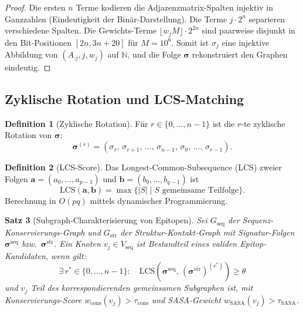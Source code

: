 ﻿\documentclass[a4paper,12pt]{article}
\theoremstyle{plain}
\newtheorem{satz}{Satz}[section]
\theoremstyle{definition}
\newtheorem{definition}[satz]{Definition}
\theoremstyle{remark}
\begin{document}
\begin{proof}
Die ersten $n$ Terme kodieren die Adjazenzmatrix-Spalten injektiv in Ganzzahlen
(Eindeutigkeit der Binär-Darstellung). Die Terme $j\cdot 2^n$ separieren verschiedene
Spalten. Die Gewichts-Terme $\lfloor w_j M\rfloor\cdot 2^{2n}$ sind paarweise disjunkt
in den Bit-Positionen $[2n, 3n+20]$ für $M=10^6$. Somit ist $\sigma_j$ eine injektive
Abbildung von $(A_{\cdot j}, j, w_j)$ auf $\mathbb{N}$, und die Folge
$\boldsymbol{\sigma}$ rekonstruiert den Graphen eindeutig.
\end{proof}

\subsection{Zyklische Rotation und LCS-Matching}

\begin{definition}[Zyklische Rotation]
Für $r\in\{0,\ldots,n-1\}$ ist die $r$-te zyklische Rotation von $\boldsymbol{\sigma}$:
\[
  \boldsymbol{\sigma}^{(r)} = (\sigma_r,\,\sigma_{r+1},\,\ldots,\,\sigma_{n-1},\,
                                \sigma_0,\,\ldots,\,\sigma_{r-1}).
\]
\end{definition}

\begin{definition}[LCS-Score]
Das Longest-Common-Subsequence (LCS) zweier Folgen $\mathbf{a}=(a_0,\ldots,a_{p-1})$
und $\mathbf{b}=(b_0,\ldots,b_{q-1})$ ist
\[
  \text{LCS}(\mathbf{a},\mathbf{b}) = \max\{|S|\mid S \text{ gemeinsame Teilfolge}\}.
\]
Berechnung in $O(pq)$ mittels dynamischer Programmierung.
\end{definition}

\begin{satz}[Subgraph-Charakterisierung von Epitopen]\label{satz:epitop}
Sei $G_{\text{seq}}$ der Sequenz-Konservierungs-Graph und $G_{\text{str}}$ der
Struktur-Kontakt-Graph mit Signatur-Folgen $\boldsymbol{\sigma}^{\text{seq}}$
bzw.\ $\boldsymbol{\sigma}^{\text{str}}$. Ein Knoten $v_j \in V_{\text{seq}}$ ist
Bestandteil eines \emph{validen Epitop-Kandidaten}, wenn gilt:
\[
  \exists\, r^* \in \{0,\ldots,n-1\}:\quad
  \text{LCS}\!\left(\boldsymbol{\sigma}^{\text{seq}},\,
  (\boldsymbol{\sigma}^{\text{str}})^{(r^*)}\right) \geq \theta
\]
und $v_j$ Teil des korrespondierenden gemeinsamen Subgraphen ist,
mit Konservierungs-Score $w_{\text{cons}}(v_j) > \tau_{\text{cons}}$ und
SASA-Gewicht $w_{\text{SASA}}(v_j) > \tau_{\text{SASA}}$.
\end{satz}
\end{document}
